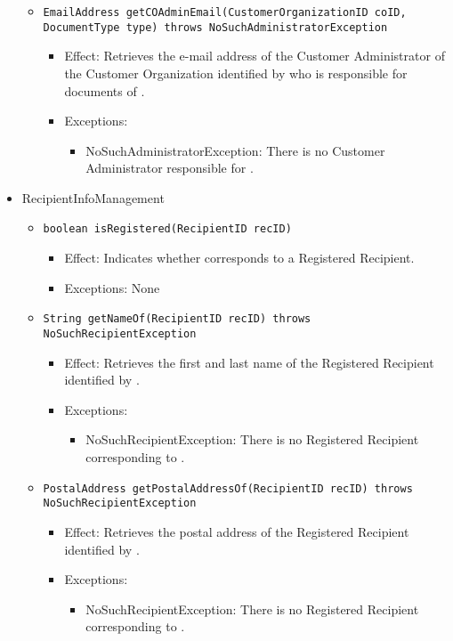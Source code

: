 \begin{itemize}
\begin{itemize}
		\item \texttt{EmailAddress getCOAdminEmail(CustomerOrganizationID coID, DocumentType type) throws NoSuchAdministratorException}
		    \begin{itemize}
                \item Effect: Retrieves the e-mail address of the Customer Administrator of the Customer Organization identified by  who is responsible for documents of .
                \item Exceptions:
				\begin{itemize}
					\item NoSuchAdministratorException: There is no Customer Administrator responsible for .
				\end{itemize}
            \end{itemize}
    \end{itemize}

    \item RecipientInfoManagement
    \begin{itemize}
        \item \texttt{boolean isRegistered(RecipientID recID)}
        \begin{itemize}
            \item Effect: Indicates whether  corresponds to a Registered Recipient.
            \item Exceptions: None
        \end{itemize}

		\item \texttt{String getNameOf(RecipientID recID) throws NoSuchRecipientException}
        \begin{itemize}
            \item Effect: Retrieves the first and last name of the Registered Recipient identified by .
            \item Exceptions:
			\begin{itemize}
				\item NoSuchRecipientException: There is no Registered Recipient corresponding to .
			\end{itemize}
        \end{itemize}

		\item \texttt{PostalAddress getPostalAddressOf(RecipientID recID) throws NoSuchRecipientException}
        \begin{itemize}
            \item Effect: Retrieves the postal address of the Registered Recipient identified by .
            \item Exceptions:
			\begin{itemize}
				\item NoSuchRecipientException: There is no Registered Recipient corresponding to .
			\end{itemize}
        \end{itemize}


\end{itemize}
\end{itemize}
